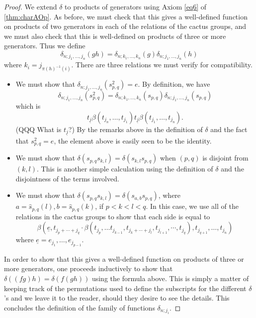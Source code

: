 \begin{proof}
We extend $\delta$ to products of generators using Axiom \ref{eq6} of \cref{thm:charAOp}. As before, we must check that this gives a well-defined function on products of two generators in each of the relations of the cactus groups, and we must also check that this is well-defined on products of three or more generators. Thus we define
  \[
    \delta_{n; j_1,\ldots,j_n}(gh) = \delta_{n; k_1,\ldots,k_n}(g)\delta_{n; j_1,\ldots,j_n}(h)
  \]
where $k_{i} = j_{\pi(h)^{-1}(i)}$. There are three relations we must verify for compatibility.
\begin{itemize}
\item We must show that $\delta_{n; j_1,\ldots,j_n}\left(s_{p,q}^{2}\right) = e$. By definition, we have
  \[
    \delta_{n; j_1,\ldots,j_n}\left(s_{p,q}^{2}\right) = \delta_{n; k_1,\ldots,k_n}\left(s_{p,q}\right)\delta_{n; j_1,\ldots,j_n}\left(s_{p,q}\right)
  \]
which is
  \[
    t_{\underline{j}}\beta(t_{j_{n}}, \ldots, t_{j_{1}}) t_{\underline{j}} \beta(t_{j_{1}}, \ldots, t_{j_{n}}).
  \]
(QQQ What is $t_{\underline{j}}$?)
By the remarks above in the definition of $\delta$ and the fact that $s_{p,q}^{2}=e$, the element above is easily seen to be the identity.
\item We must show that $\delta(s_{p,q}s_{k,l}) = \delta(s_{k,l}s_{p,q})$ when $(p,q)$ is disjoint from $(k,l)$. This is another simple calculation using the definition of $\delta$ and the disjointness of the terms involved.
\item We must show that $\delta(s_{p,q}s_{k,l}) = \delta(s_{a,b}s_{p,q})$,  where $a = \hat{s}_{p,q}(l), b = \hat{s}_{p,q}(k)$, if $p < k < l < q$. In this case, we use all of the relations in the cactus groups to show that each side is equal to
  \[
    \beta\left(\underline{e}, t_{j_{p}+\cdots + j_{q}} \cdot \beta \left(t_{j_{p}}, \ldots t_{j_{k-1}}, t_{j_{k}+ \cdots +j_{l}}, t_{j_{l+1}}, \cdots, t_{j_{q}}\right), t_{j_{q+1}}, \ldots, t_{j_{n}}\right)
  \]
where $\underline{e} = e_{j_{1}}, \ldots, e_{j_{p-1}}$.
\end{itemize}
In order to show that this gives a well-defined function on products of three or more generators, one proceeds inductively to show that $\delta\left((fg)h\right) = \delta\left(f(gh)\right)$ using the formula above. This is simply a matter of keeping track of the permutations used to define the subscripts for the different $\delta$'s and we leave it to the reader, should they desire to see the details. This concludes the definition of the family of functions $\delta_{n; j_{i}}$.


\end{proof}

